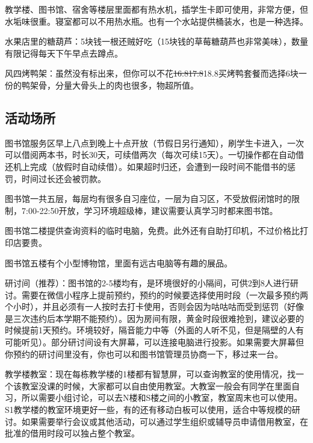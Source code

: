 教学楼、图书馆、宿舍等楼层里面都有热水机，插学生卡即可使用，非常方便，但水垢味很重。寝室都可以不用热水瓶。也有一个水站提供桶装水，也是一种选择。


水果店里的糖葫芦：5块钱一根还贼好吃（15块钱的草莓糖葫芦也非常美味），数量有限记得每天下午早点去蹲点。

风四烤鸭架：虽然没有标出来，但你可以不花\sout{16.8}\sout{17.8}18.8买烤鸭套餐而选择6块一份的鸭架骨，分量大骨头上的肉也很多，物超所值。

\subsection{活动场所}


图书馆服务区早上八点到晚上十点开放（节假日另行通知），刷学生卡进入，一次可以借阅两本书，时长30天，可续借两次（每次可续15天）。一切操作都在自动借还机上完成（放假时自动续借）。如果超时归还，会遭到一段时间不能借书的惩罚，时间过长还会被罚款。

图书馆一共五层，每层均有很多自习座位，一层为自习区，不受放假闭馆时的限制，7:00-22:50开放，学习环境超级棒，建议需要认真学习时都来图书馆。

图书馆二楼提供查询资料的临时电脑，免费。此外还有自助打印机，不过价格比打印店要贵。

图书馆五楼有个小型博物馆，里面有远古电脑等有趣的展品。


研讨间（推荐）：图书馆的2-5楼均有，是环境很好的小隔间，可供2到8人进行研讨。需要在微信小程序上提前预约，预约的时候要选择使用时段（一次最多预约两个小时），并且必须有一人按时去打卡使用，否则会因为咕咕咕而受到惩罚（好像是三次违约后本学期不能预约）。因为房间有限，黄金时段很难抢到，建议必要的时候提前1天预约。环境较好，隔音能力中等（外面的人听不见，但是隔壁的人有可能听见）。部分研讨间设有大屏幕，可以连接电脑进行投影。如果需要大屏幕但你预约的研讨间里没有，你也可以和图书馆管理员协商一下，移过来一台。

教学楼教室：现在每栋教学楼的1楼都有智慧屏，可以查询教室的使用情况，找一个该教室没课的时候，大家都可以自由使用教室。大教室一般会有同学在里面自习，所以需要小组讨论，可以去N楼和S楼之间的小教室，教室周末也可以使用。S1教学楼的教室环境更好一些，有的还有移动白板可以使用，适合中等规模的研讨。如果需要举行会议或其他活动，可以通过学生组织或辅导员申请借用教室，在批准的借用时段可以独占整个教室。

